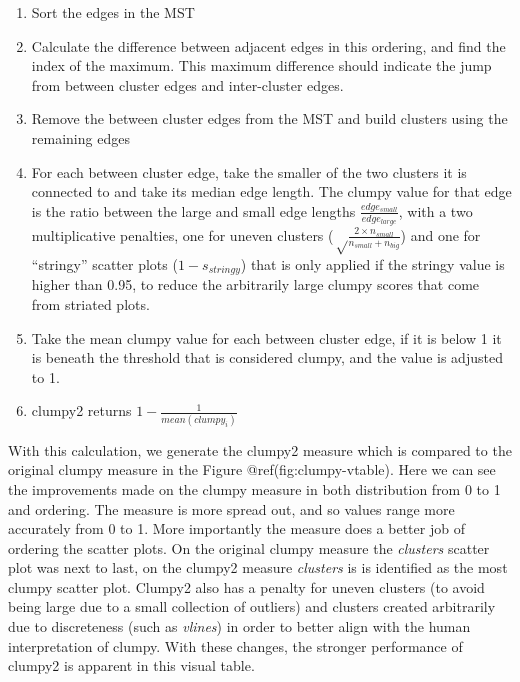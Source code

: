 \begin{enumerate}
\def\labelenumi{\arabic{enumi}.}
\tightlist
\item
  Sort the edges in the MST
\item
  Calculate the difference between adjacent edges in this ordering, and
  find the index of the maximum. This maximum difference should indicate
  the jump from between cluster edges and inter-cluster edges.
\item
  Remove the between cluster edges from the MST and build clusters using
  the remaining edges
\item
  For each between cluster edge, take the smaller of the two clusters it
  is connected to and take its median edge length. The clumpy value for
  that edge is the ratio between the large and small edge lengths
  \(\frac{edge_{small}}{edge_{large}}\), with a two multiplicative
  penalties, one for uneven clusters
  (\(\sqrt\frac{2\times n_{small}}{n_{small}+n_{big}}\)) and one for
  ``stringy'' scatter plots (\(1-s_{stringy}\)) that is only applied if
  the stringy value is higher than 0.95, to reduce the arbitrarily large
  clumpy scores that come from striated plots.
\item
  Take the mean clumpy value for each between cluster edge, if it is
  below 1 it is beneath the threshold that is considered clumpy, and the
  value is adjusted to 1.
\item
  clumpy2 returns \(1-\frac{1}{mean(clumpy_i)}\)
\end{enumerate}

With this calculation, we generate the clumpy2 measure which is compared
to the original clumpy measure in the Figure @ref(fig:clumpy-vtable).
Here we can see the improvements made on the clumpy measure in both
distribution from 0 to 1 and ordering. The measure is more spread out,
and so values range more accurately from 0 to 1. More importantly the
measure does a better job of ordering the scatter plots. On the original
clumpy measure the \emph{clusters} scatter plot was next to last, on the
clumpy2 measure \emph{clusters} is is identified as the most clumpy
scatter plot. Clumpy2 also has a penalty for uneven clusters (to avoid
being large due to a small collection of outliers) and clusters created
arbitrarily due to discreteness (such as \emph{vlines}) in order to
better align with the human interpretation of clumpy. With these
changes, the stronger performance of clumpy2 is apparent in this visual
table.

